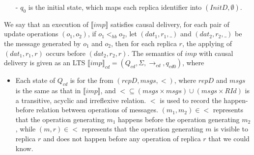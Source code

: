 {\begin{itemize}
\begin{itemize}
    Here $<_{sd} \odot msgs'$ is obtained from $<_{sd}$ by adding  $(m_1,m_2)$, when $m_1 \in msgs$, $m_2 \in msgs'$, the souce replica of $m_1$ is the same as that of $m_2$, and the desitination replica of $m_1$ is the same as that of $m_2$. {\color {red} We also require that $msg \cap msgs' = \emptyset$. This implies that no duplicate messages will be generated.}

    Recall that, if $m(a,b)$ is a query operation, then $msgs' = \emptyset$.

    \item[-] Applying a message:

    $\begin{array}{l c} \bigfrac{ m = (\_,\_,r) \in msgs,Apl(repD[r],m) = d } {(repD,msgs,<_{sd}) {\xrightarrow{apply(m)}} (repD[r:d],msgs - \{ m \},<_{sd}-m )} \end{array}$
    \end{itemize}

\item[-] $q_0$ is the initial state, which maps each replica identifier into $(InitD,\emptyset)$.
\end{itemize}

We say that an execution of $\llbracket imp \rrbracket$ satisfies causal delivery, for each pair of update operations $(o_1,o_2)$, if $o_1 <_{hb} o_2$, let $(dat_1,r_1,\_)$ and $(dat_2,r_2,\_)$ be the message generated by $o_1$ and $o_2$, then for each replica $r$, the applying of $(dat_1,r_1,r)$ occurs before $(dat_2,r_2,r)$. The semantics of $imp$ with causal delivery is given as an LTS $\llbracket imp \rrbracket_{cd} = (Q_{cd},\Sigma,\rightarrow_{cd},q_{cd0})$, where

\begin {itemize}
\setlength{\itemsep}{0.5pt}
\item[-] Each state of $Q_{cd}$ is for the from $(repD,msgs,<)$, where $repD$ and $msgs$ is the same as that in $\llbracket imp \rrbracket$, and $< \subseteq (msgs \times msgs) \cup (msgs \times RId)$ is a transitive, acyclic and irreflexive relation. $<$ is used to record the happen-before relation between operations of messages. %
    $(m_1,m_2) \in <$ represents that the operation generating $m_1$ happens before the operation generating $m_2$, while $(m,r) \in <$ represents that the operation generating $m$ is visible to replica $r$ and does not happen before any operation of replica $r$ that we could know.


\end{itemize}}
